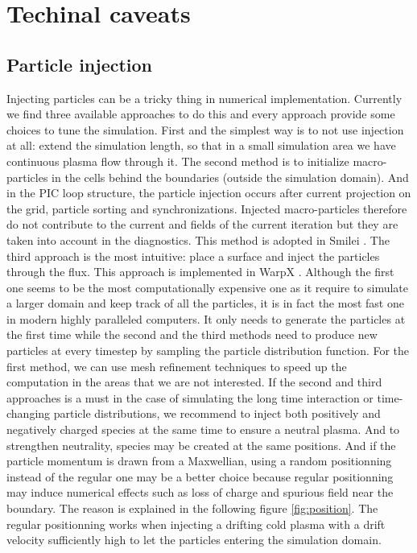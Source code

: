 
\chapter{Techinal caveats}
\section{Particle injection}

Injecting particles can be a tricky thing in numerical implementation. Currently we find three available approaches to do this and every approach provide some choices to tune the simulation. First and the simplest way is to not use injection at all: extend the simulation length, so that in a small simulation area we have continuous plasma flow through it. The second method is to initialize macro-particles in the cells behind the boundaries (outside the simulation domain). And in the PIC loop structure, the particle injection occurs after current projection on the grid, particle sorting and synchronizations. Injected macro-particles therefore do not contribute to the current and fields of the current iteration but they are taken into account in the diagnostics. This method is adopted in Smilei \citep{derouillatSmileiCollaborativeOpensource2018}. The third approach is the most intuitive: place a surface and inject the particles through the flux. This approach is implemented in WarpX \citep{vayWarpXNewExascale2017}. Although the first one seems to be the most computationally expensive one as it require to simulate a larger domain and keep track of all the particles, it is in fact the most fast one in modern highly paralleled computers. It only needs to generate the particles at the first time while the second and the third methods need to produce new particles at every timestep by sampling the particle distribution function. For the first method, we can use mesh refinement techniques to speed up the computation in the areas that we are not interested. If the second and third approaches is a must in the case of simulating the long time interaction or time-changing particle distributions, we recommend to inject both positively and negatively charged species at the same time to ensure a neutral plasma. And to strengthen neutrality, species may be created at the same positions. And if the particle momentum is drawn from a Maxwellian, using a random positionning instead of the regular one may be a better choice because regular positionning may induce numerical effects such as loss of charge and spurious field near the boundary. The reason is explained in the following figure \ref{fig:position}. The regular positionning works when injecting a drifting cold plasma with a drift velocity sufficiently high to let the particles entering the simulation domain.


